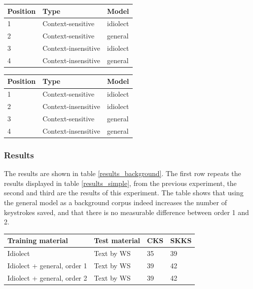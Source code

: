 \documentclass[12pt]{article}
\let\originaltable\table
\let\endoriginaltable\endtable
\renewenvironment{table}[1][ht]{%
  \originaltable[#1]
  \centering}%
  {\endoriginaltable}
\begin{document}
\begin{table}[H]
\begin{tabular}{lll} 
Position&Type&Model\\
\hline
1&Context-sensitive&idiolect\\
2&Context-sensitive&general\\
3&Context-insensitive&idiolect\\
4&Context-insensitive&general\\
\end{tabular} 
\caption{Module order with the general model as background model, version 1} \label{order1}
\end{table}

\begin{table}[H]
\begin{tabular}{lll} 
Position&Type&Model\\
\hline
1&Context-sensitive&idiolect\\
2&Context-insensitive&idiolect\\
3&Context-sensitive&general\\
4&Context-insensitive&general\\
\end{tabular} 
\caption{Module order with the general model as backgroun model, version 2} \label{order2}
\end{table}

\subsubsection{Results}

The results are shown in table \ref{results_background}. The first row repeats the results displayed in table \ref{results_simple}, from the previous experiment, the second and third are the results of this experiment. The table shows that using the general model as a background corpus indeed increases the number of keystrokes saved, and that there is no measurable difference between order 1 and 2.

\begin{table}[H]
\begin{tabular}{ll|ll} 
Training material&Test material&CKS&SKKS\\
\hline
Idiolect&Text by WS&35&39\\
Idiolect + general, order 1&Text by WS&39&42\\
Idiolect + general, order 2&Text by WS&39&42\\
\end{tabular} 
\caption{Percentage of keystrokes that can be saved when using the general model as background model} \label{results_background}
\end{table}
\end{document}

